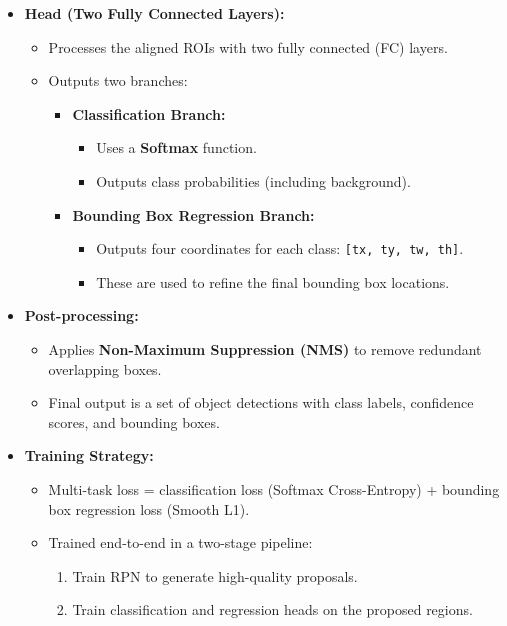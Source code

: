 \documentclass[12pt,a4paper]{article}
\begin{document}
\begin{itemize}
    \item \textbf{Head (Two Fully Connected Layers):}
    \begin{itemize}
        \item Processes the aligned ROIs with two fully connected (FC) layers.
        \item Outputs two branches:
        \begin{itemize}
            \item \textbf{Classification Branch:}
            \begin{itemize}
                \item Uses a \textbf{Softmax} function.
                \item Outputs class probabilities (including background).
            \end{itemize}
            \item \textbf{Bounding Box Regression Branch:}
            \begin{itemize}
                \item Outputs four coordinates for each class: \texttt{[tx, ty, tw, th]}.
                \item These are used to refine the final bounding box locations.
            \end{itemize}
        \end{itemize}
    \end{itemize}

    \item \textbf{Post-processing:}
    \begin{itemize}
        \item Applies \textbf{Non-Maximum Suppression (NMS)} to remove redundant overlapping boxes.
        \item Final output is a set of object detections with class labels, confidence scores, and bounding boxes.
    \end{itemize}

    \item \textbf{Training Strategy:}
    \begin{itemize}
        \item Multi-task loss = classification loss (Softmax Cross-Entropy) + bounding box regression loss (Smooth L1).
        \item Trained end-to-end in a two-stage pipeline:
        \begin{enumerate}
            \item Train RPN to generate high-quality proposals.
            \item Train classification and regression heads on the proposed regions.
        \end{enumerate}
    \end{itemize}
\end{itemize}
\end{document}
